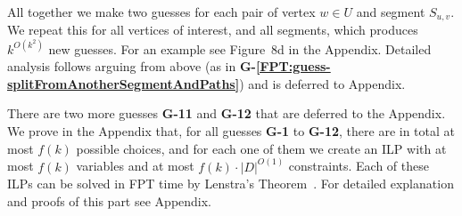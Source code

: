 \documentclass[a4paper,UKenglish,cleveref, autoref, thm-restate, anonymous]{lipics-v2021}
\newcommand{\ie}{i.\,e.,\ }
\newcounter{guesscounter}
\begin{document}
\begin{enumerate}[G-1.]

	All together we make two guesses for each pair of vertex $w \in U$ and segment $S_{u,v}$.
	We repeat this for all vertices of interest, and all segments,
	which produces $k^{O(k^2)}$ new guesses.
	For an example see Figure~8d in the Appendix.
	Detailed analysis follows arguing from above (as in \textcolor{lipicsGray}{\textsf{\textbf{G-\ref{FPT:guess-splitFromAnotherSegmentAndPaths}}}}) and is deferred to Appendix.
	\setcounter{guesscounter}{\value{enumi}}
\end{enumerate}
%


There are two more guesses \textcolor{lipicsGray}{\textsf{\textbf{G-11}}} and \textcolor{lipicsGray}{\textsf{\textbf{G-12}}} that are deferred to the Appendix. 
We prove in the Appendix that, for all guesses \textcolor{lipicsGray}{\textsf{\textbf{G-1}}} to \textcolor{lipicsGray}{\textsf{\textbf{G-12}}}, there are in total at most $f(k)$ possible choices, and for each one of them we create an ILP with at most $f(k)$ variables and at most $f(k)\cdot |D|^{O(1)}$ constraints. Each of these ILPs can be solved in FPT time by Lenstra's Theorem~\cite{Lenstra1983Integer}.
%
For detailed explanation and proofs of this part see Appendix.
\end{document}
